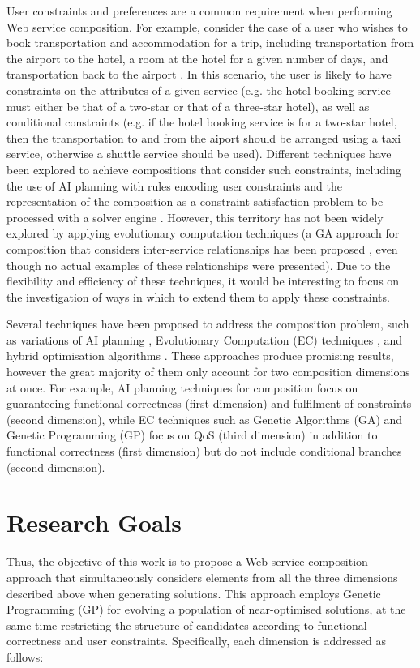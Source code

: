  User constraints and preferences are a common requirement when performing Web service composition. For example,
 consider the case of a user who wishes to book transportation and accommodation for a trip, including transportation
 from the airport to the hotel, a room at the hotel for a given number of days, and transportation back
 to the airport \cite{boustil2010web}. In this scenario, the user is likely to have constraints on the attributes
 of a given service (e.g. the hotel booking service must either be that of a two-star or that of a three-star hotel),
 as well as conditional constraints (e.g. if the hotel booking service is for a two-star hotel, then the transportation
 to and from the aiport should be arranged using a taxi service, otherwise a shuttle service should be used). Different
 techniques have been explored to achieve compositions that consider such constraints, including the use of AI planning
 with rules encoding user constraints \cite{DBLP:journals/soca/BoustilMS14} and the representation of the composition
 as a constraint satisfaction problem to be processed with a solver engine \cite{karakoc2009composing}. However, this
 territory has not been widely explored by applying evolutionary computation techniques (a GA approach for composition
 that considers inter-service relationships has been proposed \cite{zhang2013genetic}, even though no actual examples
 of these relationships were presented). Due to the flexibility and efficiency of these techniques, it would be
 interesting to focus on the investigation of ways in which to extend them to apply these constraints.

Several techniques have been proposed to address the composition problem, such as variations of AI planning \cite{chen2014qos}, Evolutionary
Computation (EC) techniques \cite{wang2012survey}, and hybrid optimisation algorithms \cite{pop2010immune}. These approaches produce promising results,
however the great majority of them only account for two composition dimensions at once. For example, AI planning techniques for
composition focus on guaranteeing functional correctness (first dimension) and fulfilment of constraints (second dimension),
while EC techniques such as Genetic Algorithms (GA) and Genetic Programming (GP) focus on QoS (third dimension) in addition to functional correctness (first dimension) but do not include conditional branches (second dimension).



\section{Research Goals}
Thus, the objective of this work is to propose a Web service composition approach that simultaneously considers elements from all the three dimensions
described above when generating solutions. This approach employs Genetic Programming (GP) for evolving a population of near-optimised solutions,
at the same time restricting the structure of candidates according to functional correctness and user constraints. Specifically, each dimension
is addressed as follows:

